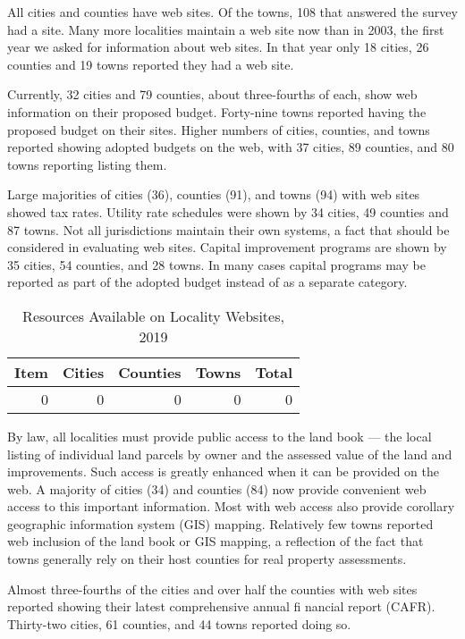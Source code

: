 \documentclass[
]{book}
\begin{document}
All cities and counties have web sites. Of the towns, 108 that answered the survey had a site. Many more localities maintain a web site now than in 2003, the first year we asked for information about web sites. In that year only 18 cities, 26 counties and 19 towns reported they had a web site.

Currently, 32 cities and 79 counties, about three-fourths of each, show web information on their proposed budget. Forty-nine towns reported having the proposed budget on their sites. Higher numbers of cities, counties, and towns reported showing adopted budgets on the web, with 37 cities, 89 counties, and 80 towns reporting listing them.

Large majorities of cities (36), counties (91), and towns (94) with web sites showed tax rates. Utility rate schedules were shown by 34 cities, 49 counties and 87 towns. Not all jurisdictions maintain their own systems, a fact that should be considered in evaluating web sites. Capital improvement programs are shown by 35 cities, 54 counties, and 28 towns. In many cases capital programs may be reported as part of the adopted budget instead of as a separate category.

\begin{table}

\caption{\label{tab:unnamed-chunk-2}Resources Available on Locality Websites, 2019}
\centering
\begin{tabular}[t]{r|r|r|r|r}
\hline
Item & Cities & Counties & Towns & Total\\
\hline
0 & 0 & 0 & 0 & 0\\
\hline
\end{tabular}
\end{table}

By law, all localities must provide public access to the land book --- the local listing of individual land parcels by owner and the assessed value of the land and improvements. Such access is greatly enhanced when it can be provided on the web. A majority of cities (34) and counties (84) now provide convenient web access to this important information. Most with web access also provide corollary geographic information system (GIS) mapping. Relatively few towns reported web inclusion of the land book or GIS mapping, a reflection of the fact that towns generally rely on their host counties for real property assessments.

Almost three-fourths of the cities and over half the counties with web sites reported showing their latest comprehensive annual fi nancial report (CAFR). Thirty-two cities, 61 counties, and 44 towns reported doing so.
\end{document}
